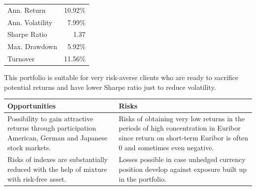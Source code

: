\documentclass[11pt, parskip=full, DIV=14]{scrreprt}
\begin{document}
\vspace{\abovedisplayskip}
\begin{minipage}{0.65\textwidth}
\end{minipage}
\begin{minipage}{0.35\textwidth}
\begin{tabular}{lr}
\toprule
Ann. Return & 10.92\%\\
Ann. Volatility & 7.99\%\\
Sharpe Ratio & 1.37\\
Max. Drawdown & 5.92\% \\
Turnover & 11.56\%\\
\bottomrule
\end{tabular}
\end{minipage}

This portfolio is suitable for very risk-averse clients who are ready to sacrifice potential returns and have lower Sharpe ratio just to reduce volatility.

\begin{table}[H]
\begin{tabularx}{\textwidth}{XX}
  \toprule
  \textbf{\textsf{Opportunities}} & \textbf{\textsf{Risks}} \\
  \midrule
Possibility to gain attractive returns through participation American, German and Japanese stock markets.&
Risks of obtaining very low returns in the periods of high concentration in Euribor since  return on short-term Euribor is often 0 and sometimes even negative. \\[1em]
Risks of indexes are substantially reduced with the help of mixture with risk-free asset. &
Losses possible in case unhedged currency position develop against exposure built up in the portfolio.\\
  \bottomrule
\end{tabularx}
\end{table}
\end{document}
